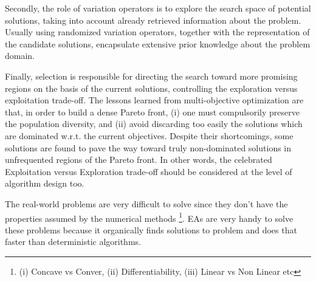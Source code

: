 \documentclass{newsig}
\begin{document}
Secondly, the role of variation operators is to explore the search space of potential solutions,
taking into account already retrieved information about the problem. Usually using randomized variation operators, together with the representation of the candidate solutions,
encapsulate extensive prior knowledge about the problem domain.



Finally, selection is responsible for directing the search toward more promising regions on
the basis of the current solutions, controlling the exploration versus exploitation trade-off. The lessons learned from multi-objective optimization are that, in order to build a
dense Pareto front, (i) one must compulsorily preserve the population diversity, and (ii) avoid
discarding too easily the solutions which are dominated w.r.t. the current objectives.
Despite their shortcomings, some solutions are found to pave the way toward truly non-dominated
solutions in unfrequented regions of the Pareto front. In other words, the
celebrated Exploitation versus Exploration trade-off should be considered at the level of
algorithm design too.

\begin{myshadowbox}
    The real-world problems are very difficult to solve since they don't have the properties assumed by the numerical methods \footnote{(i) Concave vs Conver, (ii) Differentiability, (iii) Linear vs Non Linear etc}. EAs are very handy to solve these problems because it organically finds solutions to problem and does that faster than deterministic algorithms.
\end{myshadowbox}
\end{document}
